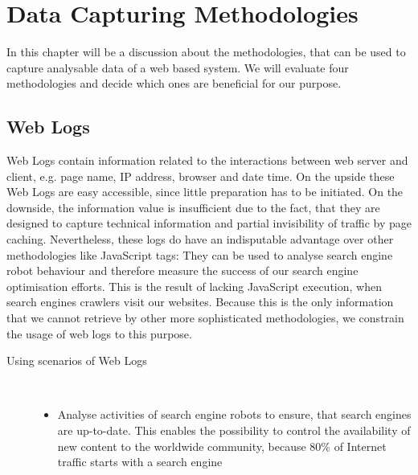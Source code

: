 \section{Data Capturing Methodologies} %
\label{sec:methodologies}
In this chapter will be a discussion about the methodologies, that can be used to capture analysable data of a web based system. We will evaluate four methodologies and decide which ones are beneficial for our purpose.


\subsection{Web Logs} %
\label{sub:web_logs}
Web Logs contain information related to the interactions between web server and client, e.g. page name, IP address, browser and date time. On the upside these Web Logs are easy accessible, since little preparation has to be initiated. On the downside, the information value is insufficient due to the fact, that they are designed to capture technical information and partial invisibility of traffic by page caching. Nevertheless, these logs do have an indisputable advantage over other methodologies like JavaScript tags: They can be used to analyse search engine robot behaviour and therefore measure the success of our search engine optimisation efforts. This is the result of lacking JavaScript execution, when search engines crawlers visit our websites. Because this is the only information that we cannot retrieve by other more sophisticated methodologies, we constrain the usage of web logs to this purpose.\citep[p. 26-27]{Kaushik07}

\begin{description}
   \item[Using scenarios of Web Logs]~\par
   \begin{itemize}
      \item Analyse activities of search engine robots to ensure, that search engines are up-to-date. This enables the possibility to control the availability of new content to the worldwide community, because 80\% of Internet traffic starts with a search engine\citep[p. 147]{Kaushik07}
   \end{itemize}
\end{description}


